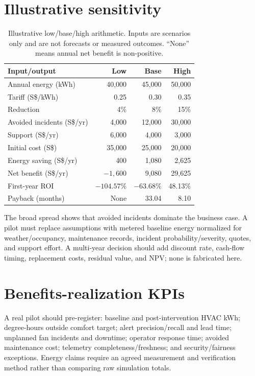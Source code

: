 \section{Illustrative sensitivity}
\begin{table}[H]
\centering
\caption{Illustrative low/base/high arithmetic. Inputs are scenarios only and are not forecasts or measured outcomes. ``None'' means annual net benefit is non-positive.}
\begin{tabular}{lrrr}
\toprule
Input/output & Low & Base & High\\
\midrule
Annual energy (kWh) & 40,000 & 45,000 & 50,000\\
Tariff (S\$/kWh) & 0.25 & 0.30 & 0.35\\
Reduction & 4\% & 8\% & 15\%\\
Avoided incidents (S\$/yr) & 4,000 & 12,000 & 30,000\\
Support (S\$/yr) & 6,000 & 4,000 & 3,000\\
Initial cost (S\$) & 35,000 & 25,000 & 20,000\\
\midrule
Energy saving (S\$/yr) & 400 & 1,080 & 2,625\\
Net benefit (S\$/yr) & $-1,600$ & 9,080 & 29,625\\
First-year ROI & $-104.57\%$ & $-63.68\%$ & 48.13\%\\
Payback (months) & None & 33.04 & 8.10\\
\bottomrule
\end{tabular}
\end{table}
The broad spread shows that avoided incidents dominate the business case. A pilot must replace assumptions with metered baseline energy normalized for weather/occupancy, maintenance records, incident probability/severity, quotes, and support effort. A multi-year decision should add discount rate, cash-flow timing, replacement costs, residual value, and NPV; none is fabricated here.

\section{Benefits-realization KPIs}
A real pilot should pre-register: baseline and post-intervention HVAC kWh; degree-hours outside comfort target; alert precision/recall and lead time; unplanned fan incidents and downtime; operator response time; avoided maintenance cost; telemetry completeness/freshness; and security/fairness exceptions. Energy claims require an agreed measurement and verification method rather than comparing raw simulation totals.

